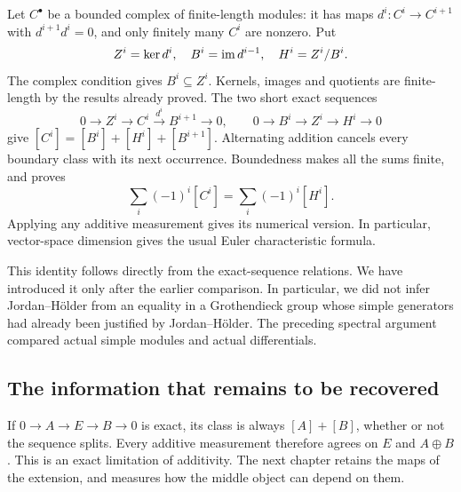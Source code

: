 Let $C^\bullet$ be a bounded complex of finite-length modules: it
has maps $d^i:C^i\to C^{i+1}$ with $d^{i+1}d^i=0$, and only
finitely many $C^i$ are nonzero. Put
\[
 Z^i=\operatorname{ker} d^i,\quad B^i=\operatorname{im} d^{i-1},\quad H^i=Z^i/B^i.
\]
The complex condition gives $B^i\subseteq Z^i$. Kernels, images and
quotients are finite-length by the results already proved. The two
short exact sequences
\[
0\to Z^i\to C^i\xrightarrow{d^i}B^{i+1}\to0,
\qquad 0\to B^i\to Z^i\to H^i\to0
\]
give $[C^i]=[B^i]+[H^i]+[B^{i+1}]$. Alternating addition cancels
every boundary class with its next occurrence. Boundedness makes all
the sums finite, and proves
\begin{equation}\label{k:euler-formula}
 \sum_i(-1)^i[C^i]=\sum_i(-1)^i[H^i].
\end{equation}
Applying any additive measurement gives its numerical version.
In particular, vector-space dimension gives the usual Euler
characteristic formula.

This identity follows directly from the exact-sequence relations.
We have introduced it only after the earlier comparison. In
particular, we did not infer Jordan--H\"older from
an equality in a Grothendieck group whose simple generators had
already been justified by Jordan--H\"older. The preceding spectral
argument compared actual simple modules and actual differentials.

\subsection{The information that remains to be recovered}

If $0\to A\to E\to B\to0$ is exact, its class is always
$[A]+[B]$, whether or not the sequence splits. Every additive
measurement therefore agrees on $E$ and $A\oplus B$.
This is an exact limitation of additivity. The next chapter retains
the maps of the extension, and measures how the middle object can
depend on them.
